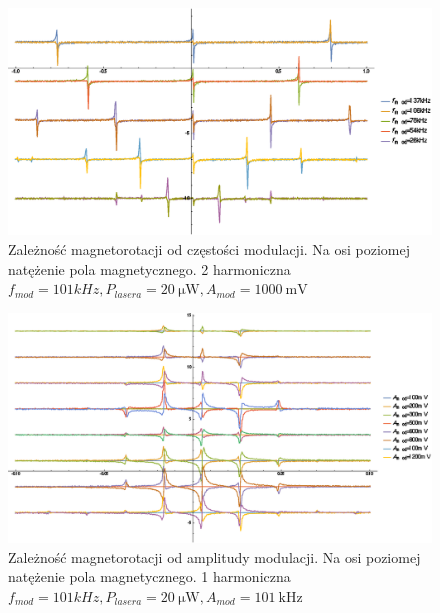 \documentclass[a4paper,10pt,twoside]{report}
\begin{document}
\begin{figure}[h!]
\centering
 \includegraphics[width=\textwidth]{panoramy_2H_odf.eps}
 \caption{Zależność magnetorotacji od częstości modulacji. Na osi poziomej natężenie pola magnetycznego. 2 harmoniczna $f_{mod}=101kHz, P_{lasera}=20~\mathrm{ \mu W}, A_{mod}=1000~\mathrm{mV}$}
 \label{fig:panodf2}
\end{figure}

\begin{figure}[h!]
\centering
 \includegraphics[width=\textwidth]{panoramy_1H_odam.eps}
 \caption{Zależność magnetorotacji od amplitudy modulacji. Na osi poziomej natężenie pola magnetycznego. 1 harmoniczna $f_{mod}=101kHz,P_{lasera}=20~\mathrm{ \mu W}, A_{mod}=101~\mathrm{kHz}$}
 \label{fig:panodam1}
\end{figure}
\end{document}

